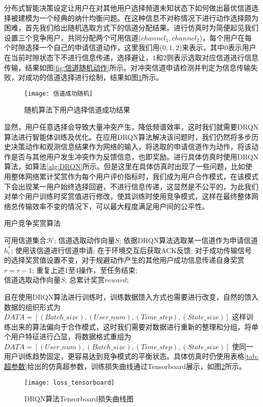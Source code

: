 分布式智能决策设定让用户在对其他用户选择频道未知状态下如何做出最优信道选择被建模为一个经典的纳什均衡问题。在这种信息不对称情况下进行动作选择颇为困难，首先我们给出随机选取方式下的信道分配结果。进行仿真时为简便起见我们设置三个竞争用户，共同分配两个可用信道($channel_{1},channel_{2}$)，每个用户在每个时隙选择一个自己的申请信道动作，这里我们用($0,1,2$)来表示，其中$0$表示用户在当前时隙状态下不进行信息传递，选择避让，$1$和$2$则表示选取对应信道进行信息传输，结果如图\ref{fig:信道随机动作}所示。对冲突信道申请检测并判定为信息传输失败，对成功的信道选择进行绘制，结果如图\ref{fig:信道成功随机}所示。
\begin{figure}[htbp]
	\centering
	\texttt{[image: 信道成功随机]}
	\caption{随机算法下用户选择信道成功结果}
	\label{fig:信道成功随机}
\end{figure}
显然，用户任意选择会导致大量冲突产生，降低频谱效率，这时我们就需要DRQN算法进行智能体训练及优化。在应用DRQN算法解决该问题时，我们仍然将多步历史决策动作和观测信息结果作为网络的输入，将选取的申请信道作为动作，将该动作是否与其他用户发生冲突作为反馈信息，也即奖励。进行具体仿真时使用DRQN算法，如算法\ref{alg:DRQN}所示。但是这里在具体仿真时出现了一些问题，比如使用整体网络累计奖赏作为每个用户评价指标时，我们成为用户合作模式，在该模式下会出现某一用户始终选择回避，不进行信息传递，这显然是不公平的，为此我们对单个用户训练时奖赏值进行修改，使其训练时使用竞争模式，这样在最终整体网络总传输效率不变的情况下，可以最大程度满足用户间的公平性。
\begin{algorithm}[htb]  
	\caption{用户竞争奖赏算法}  
	\label{alg:headstate}  
	\begin{algorithmic}[1]  
		\Require  
		可用信道集合$\mathcal{H}$; 
		\Ensure  
		信道选取动作向量$S$;  
		\State 依据DRQN算法选取某一信道作为申请信道$h_{i}^{*}$;
		\State 使用该信道进行信道申请;				
		\State 在于环境交互后获取ACK反馈;  
		\State 对于成功传输信号的选择奖赏值设置不变，对于规避动作产生的其他用户成功信息传递自身奖赏$r=r-1$;
		\State 重复上述1至4操作，至任务结束; \\
		\Return 信道选取动作向量$S$; 总累计奖赏$reward$; 
	\end{algorithmic}  
\end{algorithm}  
且在使用DRQN算法进行训练时，训练数据馈入方式也需要进行改变，自然的馈入数据的组织形式为$DATA=\left[\left(Batch\_size \right),\left(User\_num \right),\left(Time\_step \right),\left(State\_size \right)\right]$ 这样训练出来的算法偏向于合作模式，这时我们需要对数据进行重新的整理和分组，将单个用户特征进行凸显，将数据格式重组为$DATA=\left[\left(User\_num \right),\left(Batch\_size \right),\left(Time\_step \right),\left(State\_size \right)\right]$ 使同一用户训练趋势固定，更容易达到竞争模式的平衡状态。具体仿真时仍使用表格\ref{tab:超参数}给出的仿真超参数，训练损失曲线通过Tensorboard展示，如图\ref{fig:loss_tensorboard}所示。
\begin{figure}[htbp]
	\centering
	\texttt{[image: loss\_tensorboard]}
	\caption{DRQN算法Tensorboard损失曲线图}
	\label{fig:loss_tensorboard}
\end{figure}
